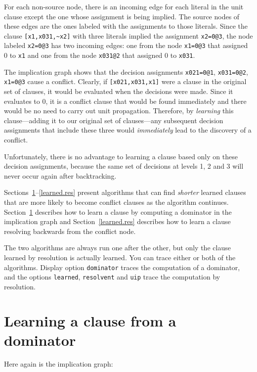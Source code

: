 \documentclass[11pt]{report}
\newcommand*{\p}[1]{\textup{\texttt{#1}}}
\begin{document}
For each non-source node, there is an incoming edge for each literal in
the unit clause except the one whose assignment is being implied. The
source nodes of these edges are the ones labeled with the assignments to
those literals. Since the clause \verb+[x1,x031,~x2]+ with three
literals implied the assignment \p{x2=0@3}, the node labeled \p{x2=0@3}
has two incoming edges: one from the node \p{x1=0@3} that assigned 0 to
\p{x1} and one from the node \p{x031@2} that assigned 0 to \p{x031}.

The implication graph shows that the decision assignments \p{x021=0@1},
\p{x031=0@2}, \p{x1=0@3} cause a conflict. Clearly, if
\verb+[x021,x031,x1]+ were a clause in the original set of clauses, it
would be evaluated when the decisions were made. Since it evaluates to
0, it is a conflict clause that would be found immediately and there
would be no need to carry out unit propagation. Therefore, by
\emph{learning} this clause---adding it to our original set of
clauses---any subsequent decision assignments that include these three
would \emph{immediately} lead to the discovery of a conflict.

Unfortunately, there is no advantage to learning a clause based only on
these decision assignments, because the same set of decisions at levels
1, 2 and 3 will never occur again after backtracking.

Sections~\ref{learned.dom}--\ref{learned.res} present algorithms that
can find \emph{shorter} learned clauses that are more likely to become
conflict clauses as the algorithm continues. Section~\ref{learned.dom}
describes how to learn a clause by computing a dominator in the
implication graph and Section~\ref{learned.res} describes how to learn a
clause resolving backwards from the conflict node.

The two algorithms are always run one after the other, but only the
clause learned by resolution is actually learned. You can trace either
or both of the algorithms. Display option \p{dominator} traces the
computation of a dominator, and the options \p{learned}, \p{resolvent}
and \p{uip} trace the computation by resolution.

\newpage

\section{Learning a clause from a dominator}\label{learned.dom}

Here again is the implication graph:
\end{document}
